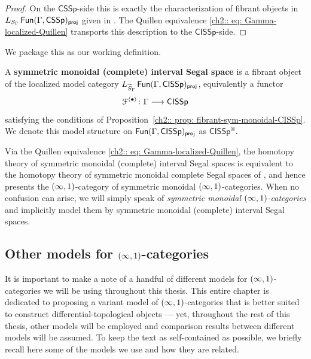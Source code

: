 \begin{proof}
  On the $\mathsf{CSSp}$-side this is exactly the characterization of
  fibrant objects in $L_{S_{\Gamma}}\operatorname{\sf Fun}(\Gamma,\mathsf{CSSp})_{\mathsf{proj}}$
  given in \cite[Definition~3.6]{CS19}. The Quillen equivalence
  \eqref{ch2:: eq: Gamma-localized-Quillen} transports this description
  to the $\mathsf{CISSp}$-side.
\end{proof}

We package this as our working definition.

\begin{definition}\label{ch2:: def: symmetric-monoidal-CISSp}
  A \textbf{symmetric monoidal (complete) interval Segal space} is a
  fibrant object of the localized model category
  $L_{\widetilde{S}_\Gamma}\operatorname{\sf Fun}(\Gamma, \mathsf{CISSp})_{\mathsf{proj}}$, equivalently a
  functor
  \begin{equation}
    \mathcal F^{\langle \bullet \rangle} \colon \Gamma \longrightarrow \mathsf{CISSp}
  \end{equation}
  satisfying the conditions of
  Proposition~\textup{\ref{ch2:: prop: fibrant-sym-monoidal-CISSp}}. We denote this model structure on $\operatorname{\sf Fun}(\Gamma, \mathsf{CISSp})_{\mathsf{proj}}$ as $\mathsf{CISSp}^{\otimes}$.
\end{definition}

\begin{remark}
  Via the Quillen equivalence
  \eqref{ch2:: eq: Gamma-localized-Quillen}, the homotopy theory of
  symmetric monoidal (complete) interval Segal spaces is equivalent to
  the homotopy theory of symmetric monoidal complete Segal spaces of
  \cite{CS19}, and hence presents the $(\operatorname{\infty},1)$-category of symmetric
  monoidal $(\operatorname{\infty},1)$-categories. When no confusion can arise, we will
  simply speak of \emph{symmetric monoidal $(\operatorname{\infty},1)$-categories} and
  implicitly model them by symmetric monoidal (complete) interval Segal
  spaces.
\end{remark}


\subsection{Other models for \texorpdfstring{$(\operatorname{\infty},1)$}{(infty,1)}-categories}

It is important to make a note of a handful of different models for
$(\operatorname{\infty},1)$-categories we will be using throughout this thesis.  This entire
chapter is dedicated to proposing a variant model of $(\operatorname{\infty},1)$-categories that
is better suited to construct differential-topological objects --- yet,
throughout the rest of this thesis, other models will be employed and
comparison results between different models will be assumed.  To keep the text
as self-contained as possible, we briefly recall here some of the models we
use and how they are related.

